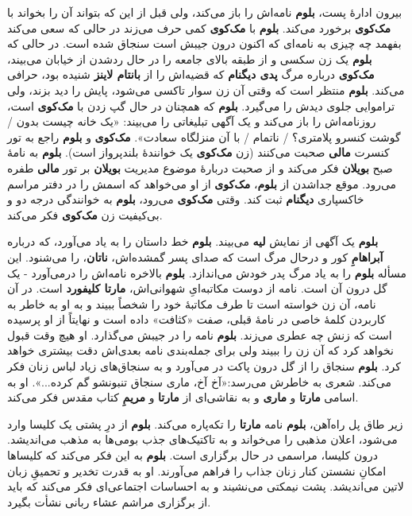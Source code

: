 \documentclass[12pt]{book}
\newcommand{\noun}[1]{{\textbf{#1}}}
\begin{document}
    بیرون ادارهٔ پست، \noun{بلوم} نامه‌اش را باز می‌کند، ولی قبل از این که بتواند آن را بخواند با \noun{مک‌کوی} برخورد می‌کند. \noun{بلوم} با \noun{مک‌کوی} کمی حرف می‌زند در حالی که سعی می‌کند بفهمد چه چیزی به نامه‌ای که اکنون درون جیبش است سنجاق شده است. در حالی که \noun{بلوم} یک زن سکسی و از طبقه بالای جامعه را در حال ردشدن از خیابان می‌بیند، \noun{مک‌کوی} درباره مرگ \noun{پدی دیگنام} که قضیه‌اش را از \noun{بانتام لاینز} شنیده بود، حرافی می‌کند. \noun{بلوم} منتظر است که وقتی آن زن سوار تاکسی می‌شود، پایش را دید بزند، ولی تراموایی جلوی دیدش را می‌گیرد. \noun{بلوم} که همچنان در حال گپ زدن با \noun{مک‌کوی} است، روزنامه‌اش را باز می‌کند و یک آگهی تبلیغاتی را می‌بیند: «یک خانه چیست بدون / گوشت کنسرو پلامتری؟ / ناتمام / با آن منزلگاه سعادت». \noun{مک‌کوی} و \noun{بلوم} راجع به تور کنسرت \noun{مالی} صحبت می‌کنند (زن \noun{مک‌کوی} یک خوانندهٔ بلندپرواز است). \noun{بلوم} به نامهٔ صبح \noun{بویلان} فکر می‌کند و از صحبت دربارهٔ موضوع مدیریت \noun{بویلان} بر تور \noun{مالی} طفره می‌رود. موقع جداشدن از \noun{بلوم}، \noun{مک‌کوی} از او می‌خواهد که اسمش را در دفتر مراسم خاکسپاری \noun{دیگنام} ثبت کند. وقتی \noun{مک‌کوی} می‌رود، \noun{بلوم} به خوانندگی درجه دو و بی‌کیفیت زن \noun{مک‌کوی} فکر می‌کند.

    \noun{بلوم} یک آگهی از نمایش \noun{لیه} می‌بیند. \noun{بلوم} خط داستان را به یاد می‌آورد، که درباره \noun{آبراهامِ} کور و درحال مرگ است که صدای پسر گمشده‌اش، \noun{ناتان}، را می‌شنود. این مسأله \noun{بلوم} را به یاد مرگ پدر خودش می‌اندازد. \noun{بلوم} بالاخره نامه‌اش را درمی‌آورد - یک گل درون آن است. نامه از دوست مکاتبه‌ایِ شهوانی‌اش، \noun{مارتا کلیفورد} است. در آن نامه، آن زن خواسته است تا طرف مکاتبهٔ خود را شخصاً ببیند و به او به خاطر به کاربردن کلمهٔ خاصی در نامهٔ قبلی، صفت «کثافت» داده است و نهایتاً از او پرسیده است که زنش چه عطری می‌زند. \noun{بلوم} نامه را در جیبش می‌گذارد. او هیچ وقت قبول نخواهد کرد که آن زن را ببیند ولی برای جمله‌بندی نامه بعدی‌اش دقت بیشتری خواهد کرد. \noun{بلوم} سنجاق را از گل درون پاکت در می‌آورد و به سنجاق‌های زیاد لباس زنان فکر می‌کند. شعری به خاطرش می‌رسد:«آخ آخ، ماری سنجاق تنبونشو گم کرده...». او به اسامی \noun{مارتا} و \noun{ماری} و به نقاشی‌ای از \noun{مارتا} و \noun{مریمِ} کتاب مقدس فکر می‌کند.

    زیر طاق پل راه‌آهن، \noun{بلوم} نامه \noun{مارتا} را تکه‌پاره می‌کند. \noun{بلوم} از درِ پشتی یک کلیسا وارد می‌شود، اعلان مذهبی را می‌خواند و به تاکتیک‌های جذب بومی‌ها به مذهب می‌اندیشد. درون کلیسا، مراسمی در حال برگزاری است. \noun{بلوم} به این فکر می‌کند که کلیساها امکانِ نشستن کنار زنان جذاب را فراهم می‌آورند. او به قدرت تخدیر و تحمیقِ زبان لاتین می‌اندیشد. پشت نیمکتی می‌نشیند و به احساسات اجتماعی‌ای فکر می‌کند که باید از برگزاری مراشم عشاء ربانی نشأت بگیرد.
\end{document}
